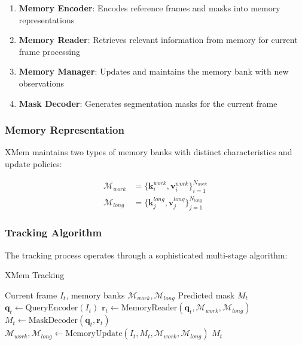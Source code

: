\documentclass[12pt]{article}
\begin{document}
\begin{enumerate}
  \item \textbf{Memory Encoder}: Encodes reference frames and masks into memory representations
  \item \textbf{Memory Reader}: Retrieves relevant information from memory for current frame processing
  \item \textbf{Memory Manager}: Updates and maintains the memory bank with new observations
  \item \textbf{Mask Decoder}: Generates segmentation masks for the current frame
\end{enumerate}

\subsubsection{Memory Representation}

XMem maintains two types of memory banks with distinct characteristics and update policies:

\begin{align}
  \mathcal{M}_{work} & = \{\mathbf{k}_i^{work}, \mathbf{v}_i^{work}\}_{i=1}^{N_{work}} \\
  \mathcal{M}_{long} & = \{\mathbf{k}_j^{long}, \mathbf{v}_j^{long}\}_{j=1}^{N_{long}}
\end{align}

\subsubsection{Tracking Algorithm}

The tracking process operates through a sophisticated multi-stage algorithm:

\begin{algorithm}[H]
  \caption{XMem Tracking}
  \begin{algorithmic}[1]
    \REQUIRE Current frame $I_t$, memory banks $\mathcal{M}_{work}, \mathcal{M}_{long}$
    \ENSURE Predicted mask $M_t$
    \STATE $\mathbf{q}_t \leftarrow \text{QueryEncoder}(I_t)$
    \STATE $\mathbf{r}_t \leftarrow \text{MemoryReader}(\mathbf{q}_t, \mathcal{M}_{work}, \mathcal{M}_{long})$
    \STATE $M_t \leftarrow \text{MaskDecoder}(\mathbf{q}_t, \mathbf{r}_t)$
    \STATE $\mathcal{M}_{work}, \mathcal{M}_{long} \leftarrow \text{MemoryUpdate}(I_t, M_t, \mathcal{M}_{work}, \mathcal{M}_{long})$
    \RETURN $M_t$
  \end{algorithmic}
\end{algorithm}
\end{document}
